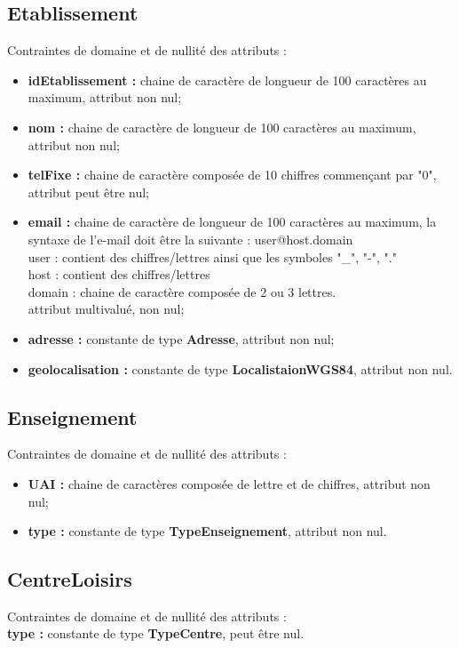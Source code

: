 \documentclass[asi, sansVersion]{picInsa}
\begin{document}
\subsection*{Etablissement}
Contraintes de domaine et de nullité des attributs :
\begin{itemize}
 	\item \textbf{idEtablissement :} chaine de caractère de longueur de 100 caractères au maximum, attribut non nul;
	\item \textbf{nom :} chaine de caractère de longueur de 100 caractères au maximum, attribut non nul;
	\item \textbf{telFixe :} chaine de caractère composée de 10 chiffres commençant par "0", attribut peut être nul;
	\item \textbf{email :} chaine de caractère de longueur de 100 caractères au maximum, la syntaxe de l'e-mail doit être la suivante : user@host.domain\\
	user : contient des chiffres/lettres ainsi que les symboles "\_", "-", "." \\
	host : contient des chiffres/lettres \\
	domain : chaine de caractère composée de 2 ou 3 lettres. \\
	attribut multivalué, non nul; 
	\item \textbf{adresse :} constante de type \textbf{Adresse}, attribut non nul; 
	\item \textbf{geolocalisation :} constante de type \textbf{LocalistaionWGS84}, attribut non nul.\\
\end{itemize}  

\subsection*{Enseignement}
Contraintes de domaine et de nullité des attributs :
\begin{itemize}
	\item \textbf{UAI :} chaine de caractères composée de lettre et de chiffres, attribut non nul;
	\item \textbf{type :} constante de type \textbf{TypeEnseignement}, attribut non nul.\\
\end{itemize}

\subsection*{CentreLoisirs}
Contraintes de domaine et de nullité des attributs :\\
\indent \indent \textbf{type :} constante de type \textbf{TypeCentre}, peut être nul.\\
\end{document}
